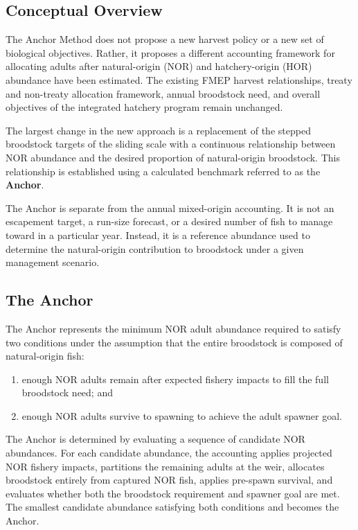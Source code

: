 \documentclass[12pt,letterpaper]{article}
\providecommand{\tightlist}{%
  \setlength{\itemsep}{0pt}\setlength{\parskip}{0pt}}
\begin{document}
\subsection{Conceptual Overview}\label{conceptual-overview}

The Anchor Method does not propose a new harvest policy or a new set of biological objectives. Rather, it proposes a different accounting framework for allocating adults after natural-origin (NOR) and hatchery-origin (HOR) abundance have been estimated. The existing FMEP harvest relationships, treaty and non-treaty allocation framework, annual broodstock need, and overall objectives of the integrated hatchery program remain unchanged.

The largest change in the new approach is a replacement of the stepped broodstock targets of the sliding scale with a continuous relationship between NOR abundance and the desired proportion of natural-origin broodstock. This relationship is established using a calculated benchmark referred to as the \textbf{Anchor}.

The Anchor is separate from the annual mixed-origin accounting. It is not an escapement target, a run-size forecast, or a desired number of fish to manage toward in a particular year. Instead, it is a reference abundance used to determine the natural-origin contribution to broodstock under a given management scenario.

\subsection{The Anchor}\label{the-anchor}

The Anchor represents the minimum NOR adult abundance required to satisfy two conditions under the assumption that the entire broodstock is composed of natural-origin fish:

\begin{enumerate}
\def\labelenumi{\arabic{enumi}.}
\tightlist
\item
  enough NOR adults remain after expected fishery impacts to fill the full broodstock need; and
\item
  enough NOR adults survive to spawning to achieve the adult spawner goal.
\end{enumerate}

The Anchor is determined by evaluating a sequence of candidate NOR abundances. For each candidate abundance, the accounting applies projected NOR fishery impacts, partitions the remaining adults at the weir, allocates broodstock entirely from captured NOR fish, applies pre-spawn survival, and evaluates whether both the broodstock requirement and spawner goal are met. The smallest candidate abundance satisfying both conditions and becomes the Anchor.
\end{document}
